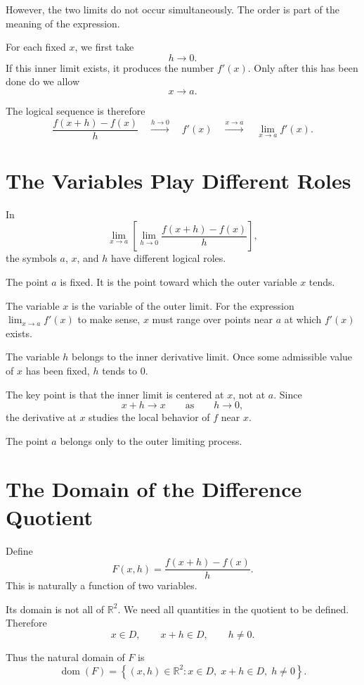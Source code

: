 \documentclass{essay}
\begin{document}
However, the two limits do not occur simultaneously. The order is part of the meaning of the expression.

For each fixed \(x\), we first take
\[ h\to 0. \]
If this inner limit exists, it produces the number \(f'(x)\). Only after this has been done do we allow
\[ x\to a. \]

The logical sequence is therefore
\[ \frac{f(x+h)-f(x)}{h} \quad\xrightarrow{h\to 0}\quad f'(x) \quad\xrightarrow{x\to a}\quad \lim_{x\to a}f'(x). \]

\section{The Variables Play Different Roles}

In
\[ \lim_{x\to a} \left[ \lim_{h\to 0} \frac{f(x+h)-f(x)}{h} \right], \]
the symbols \(a\), \(x\), and \(h\) have different logical roles.

The point \(a\) is fixed. It is the point toward which the outer variable \(x\) tends.

The variable \(x\) is the variable of the outer limit. For the expression \(\lim_{x\to a}f'(x)\) to make sense, \(x\) must range over points near \(a\) at which \(f'(x)\) exists.

The variable \(h\) belongs to the inner derivative limit. Once some admissible value of \(x\) has been fixed, \(h\) tends to \(0\).

The key point is that the inner limit is centered at \(x\), not at \(a\). Since
\[ x+h\to x \qquad\text{as}\qquad h\to 0, \]
the derivative at \(x\) studies the local behavior of \(f\) near \(x\).

The point \(a\) belongs only to the outer limiting process.

\section{The Domain of the Difference Quotient}

Define
\[ F(x,h) = \frac{f(x+h)-f(x)}{h}. \]
This is naturally a function of two variables.

Its domain is not all of \(\mathbb{R}^{2}\). We need all quantities in the quotient to be defined. Therefore
\[ x\in D, \qquad x+h\in D, \qquad h\neq 0. \]

Thus the natural domain of \(F\) is
\[ \boxed{ \operatorname{dom}(F) = \left\{ (x,h)\in\mathbb{R}^{2}: x\in D,\; x+h\in D,\; h\neq 0 \right\}. } \]
\end{document}
